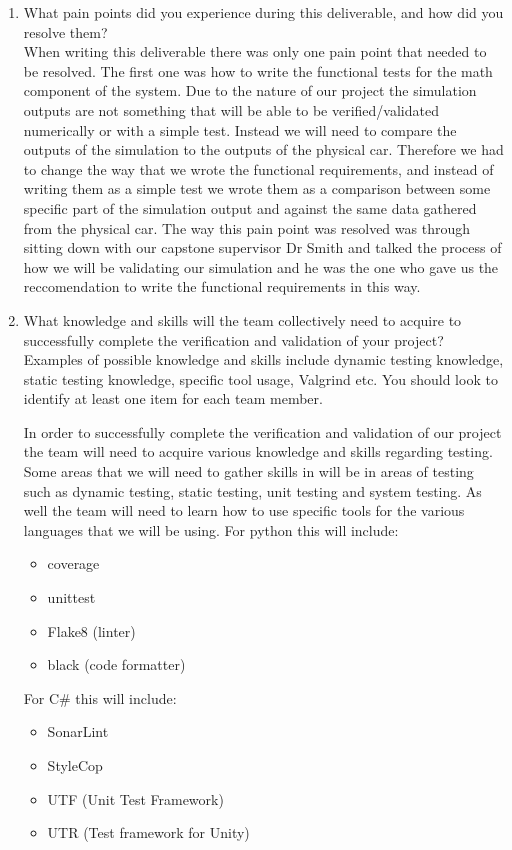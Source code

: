 \documentclass[12pt, titlepage]{article}
\begin{document}
\begin{enumerate}
  \item What pain points did you experience during this deliverable, and how
    did you resolve them?\\
    When writing this deliverable there was only one pain point that needed to be resolved.
    The first one was how to write the functional tests for the math component of the system.
    Due to the nature of our project the simulation outputs are not something that will be able to be verified/validated numerically or with a simple test.
    Instead we will need to compare the outputs of the simulation to the outputs of the physical car.
    Therefore we had to change the way that we wrote the functional requirements, and instead of writing them as a simple test we wrote them as a comparison between some specific part of the simulation output and against the same data gathered from the physical car.
    The way this pain point was resolved was through sitting down with our capstone supervisor Dr Smith and talked the process of how we will be validating our simulation and he was the one who gave us the reccomendation to write the functional requirements in this way.
  \item What knowledge and skills will the team collectively need to acquire to
  successfully complete the verification and validation of your project?
  Examples of possible knowledge and skills include dynamic testing knowledge,
  static testing knowledge, specific tool usage, Valgrind etc.  You should look to
  identify at least one item for each team member.

  In order to successfully complete the verification and validation of our project the team will need to acquire various knowledge and skills regarding testing.
  Some areas that we will need to gather skills in will be in areas of testing such as dynamic testing, static testing, unit testing and system testing. 
  As well the team will need to learn how to use specific tools for the various languages that we will be using.
  For python this will include:
  \begin{itemize}
    \item coverage
    \item unittest
    \item Flake8 (linter)
    \item black (code formatter)
  \end{itemize}
  For C\# this will include:
  \begin{itemize}
    \item SonarLint
    \item StyleCop
    \item UTF (Unit Test Framework)
    \item UTR (Test framework for Unity)
  \end{itemize}


\end{enumerate}
\end{document}
